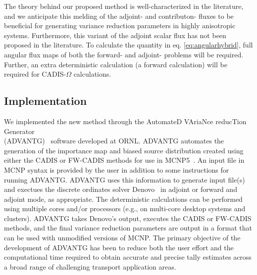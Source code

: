 \documentclass[12pt]{article}
\begin{document}
The theory behind our proposed method is well-characterized in the literature, and we anticipate this melding of the adjoint- and contributon- fluxes to be beneficial for generating variance reduction parameters in highly anisotropic systems. Furthermore, this variant of the adjoint scalar flux has not been proposed in the literature. To calculate the quantity in eq. \eqref{eq:angularhybrid}, full angular flux maps of both the forward- and adjoint- problems will be required. Further, an extra deterministic calculation (a forward calculation) will be required for CADIS-$\Omega$ calculations.



%

\subsection{Implementation}
\label{subsect::implementation}

We implemented the new method through the AutomateD VAriaNce reducTion Generator\\ (ADVANTG)~\cite{wagner_automated_2002, mosher_new_2010} software developed at ORNL. 
ADVANTG automates the generation of the importance map and biased source distribution created using either the CADIS or FW-CADIS methods for use in MCNP5~\cite{brown_mcnp_2002}. 
An input file in MCNP syntax is provided by the user in addition to some instructions for running ADVANTG. 
ADVANTG uses this information to generate input file(s) and exectues the discrete ordinates solver Denovo~\cite{evans_denovo:_2010} in adjoint or forward and adjoint mode, as appropriate.
The deterministic calculations can be performed using multiple cores and/or processors (e.g., on multi-core desktop systems and clusters). 
ADVANTG takes Denovo's output, executes the CADIS or FW-CADIS methods, and the final variance reduction parameters are output in a format that can be used with unmodified versions of MCNP. 
The primary objective of the development of ADVANTG has been to reduce both the user effort and the computational time required to obtain accurate and precise tally estimates
across a broad range of challenging transport application areas.
\end{document}
